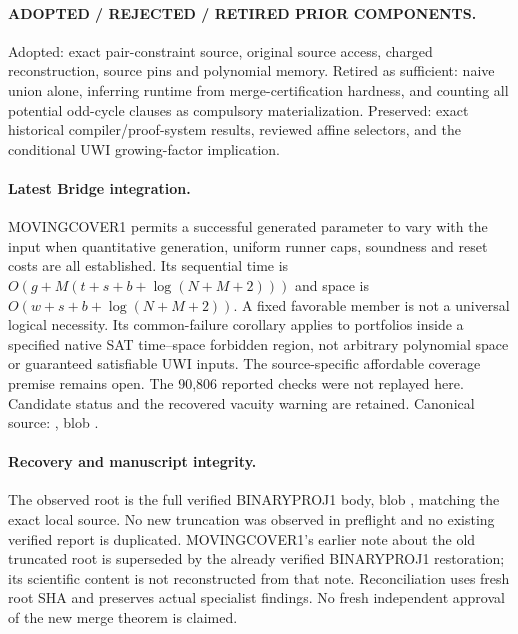 \documentclass[11pt]{article}
\begin{document}
\paragraph{ADOPTED / REJECTED / RETIRED PRIOR COMPONENTS.}
Adopted: exact pair-constraint source, original source access, charged
reconstruction, source pins and polynomial memory. Retired as sufficient:
naive union alone, inferring runtime from merge-certification hardness, and
counting all potential odd-cycle clauses as compulsory materialization.
Preserved: exact historical compiler/proof-system results, reviewed affine
selectors, and the conditional UWI growing-factor implication.

\paragraph{Latest Bridge integration.}
MOVINGCOVER1 permits a successful generated parameter to vary with the
input when quantitative generation, uniform runner caps, soundness and reset
costs are all established. Its sequential time is
$O(g+M(t+s+b+\log(N+M+2)))$ and space is
$O(w+s+b+\log(N+M+2))$. A fixed favorable member is not a universal logical
necessity. Its common-failure corollary applies to portfolios inside a
specified native SAT time--space forbidden region, not arbitrary polynomial
space or guaranteed satisfiable UWI inputs. The source-specific affordable
coverage premise remains open. The 90,806 reported checks were not replayed
here. Candidate status and the recovered vacuity warning are retained.
Canonical source:
,
blob .

\paragraph{Recovery and manuscript integrity.}
The observed root is the full verified BINARYPROJ1 body, blob
, matching the exact local
source. No new truncation was observed in preflight and no existing verified
report is duplicated. MOVINGCOVER1's earlier note about the old truncated
root is superseded by the already verified BINARYPROJ1 restoration; its
scientific content is not reconstructed from that note. Reconciliation uses
fresh root SHA and preserves actual specialist findings. No fresh independent
approval of the new merge theorem is claimed.
\end{document}
